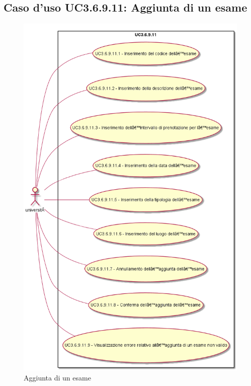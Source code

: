 \subsection{Caso d'uso \texorpdfstring{UC3.6.9.11}{UC3.6.9.11}: Aggiunta di un esame}
\begin{figure} [H]
\centering
\includegraphics[scale=0.45]{./img/UC3-6-9-11.png}
\caption{Aggiunta di un esame}\label{}
\end{figure}
